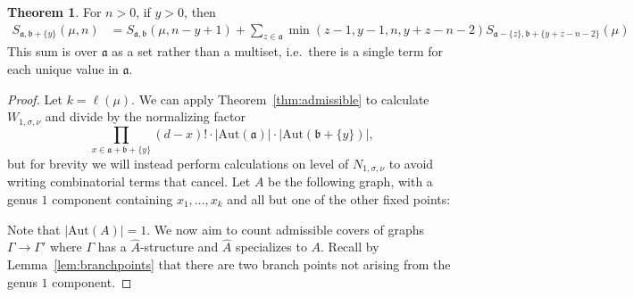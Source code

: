 \documentclass[11pt]{article}           %
\newcommand{\Aut}{\text{Aut}}
\renewcommand{\a}{\mathfrak a}
\renewcommand{\b}{\mathfrak b}
\theoremstyle{definition}
\newtheorem{thm}{Theorem}[section]
\begin{document}
\begin{thm}
  \label{thm:reduceb}
  For $n>0$, if $y>0$, then
  \begin{align*}
    S_{\mathfrak a,\mathfrak b+\{y\}}(\mu, n) &=S_{\mathfrak a,\mathfrak b}(\mu, n-y+1) +\sum_{z\in\mathfrak a}\min(z-1,y-1,n,y+z-n-2)S_{\mathfrak a-\{z\},\mathfrak b+\{y+z-n-2\}}(\mu)
  \end{align*}
  This sum is over $\a$ as a set rather than a multiset, i.e.\ there is
  a single term for each unique value in $\a$.
\end{thm}

\begin{proof}
  Let $k=\ell(\mu)$. We can apply Theorem~\ref{thm:admissible}
  to calculate $W_{1,\sigma,\nu}$ and divide by the normalizing factor
  \[ 
  \prod_{x\in\a+\b+\{y\}}(d-x)!\cdot |\Aut(\a)|\cdot |\Aut(\b+\{y\})|,
  \]
  but for brevity we will instead perform calculations on level of
  $N_{1,\sigma,\nu}$ to avoid writing combinatorial terms that cancel.
  Let $A$ be the following graph,
  with a genus $1$ component containing $x_1,\dots,x_k$ and all but one
  of the other fixed points:


                  Note that $|\Aut(A)|=1$.
We now aim to count admissible covers of graphs $\Gamma\to\Gamma'$ where $\Gamma$ has a $\hat A$-structure and $\hat A$ specializes to $A$.
Recall by Lemma~\ref{lem:branchpoints} that there are two branch points not
  arising from the genus $1$ component.
  

\end{proof}
\end{document}
